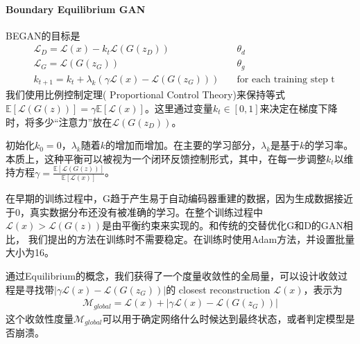             \paragraph{Boundary Equilibrium GAN}BEGAN的目标是
            \begin{align*}
            & \mathcal{L}_D = \mathcal{L}(x) - k_t\mathcal{L}(G(z_D))\quad& \theta_d\\
            & \mathcal{L}_G = \mathcal{L}(G(z_G))\quad& \theta_g\\
            & k_{t+1} = k_t + \lambda_k(\gamma\mathcal{L}(x)-\mathcal{L}(G(z_G))) \quad& \text{for each training step t}
            \end{align*}
            我们使用比例控制定理( Proportional Control Theory)来保持等式$\mathbb{E}[\mathcal{L}(G(z))]=\gamma \mathbb{E}[\mathcal{L}(x)]$。这里通过变量$k_t\in [0,1]$来决定在梯度下降时，将多少“注意力”放在$\mathcal{L}(G(z_D))$。
            \par
            初始化$k_0 = 0$，$\lambda_k$随着$k$的增加而增加。在主要的学习部分，$\lambda_k$是基于$k$的学习率。本质上，这种平衡可以被视为一个闭环反馈控制形式，其中，在每一步调整$k_t$以维持方程$\gamma = \frac{\mathbb{E}[\mathcal{L}(G(z))]}{\mathbb{E}[\mathcal{L}(x)]}$。
            \par
            在早期的训练过程中，G趋于产生易于自动编码器重建的数据，因为生成数据接近于0，真实数据分布还没有被准确的学习。在整个训练过程中$\mathcal{L}(x) > \mathcal{L}(G(z))$是由平衡约束来实现的。和传统的交替优化G和D的GAN相比， 我们提出的方法在训练时不需要稳定。在训练时使用Adam方法，并设置批量大小为16。
            \par
            通过Equilibrium的概念，我们获得了一个度量收敛性的全局量，可以设计收敛过程是寻找带$|\gamma\mathcal{L}(x)-\mathcal{L}(G(z_G))|$的 closest reconstruction $\mathcal{L}(x)$，表示为
            \begin{align*}
            \mathcal{M}_{global} = \mathcal{L}(x)+ |\gamma\mathcal{L}(x)-\mathcal{L}(G(z_G))|
            \end{align*}
            这个收敛性度量$\mathcal{M}_{global}$可以用于确定网络什么时候达到最终状态，或者判定模型是否崩溃。

